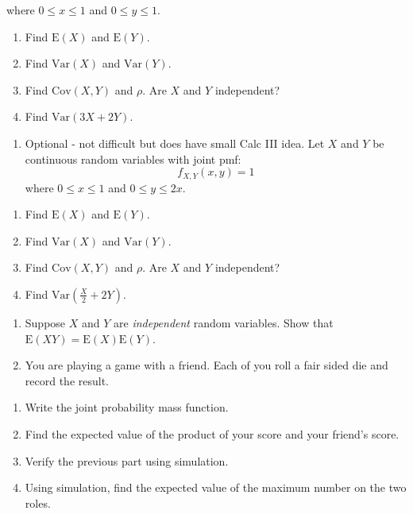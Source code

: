 \documentclass[
  letterpaper,
  DIV=11,
  numbers=noendperiod]{scrreprt}
\providecommand{\tightlist}{%
  \setlength{\itemsep}{0pt}\setlength{\parskip}{0pt}}\usepackage{longtable,booktabs,array}
\begin{document}
where \(0 \leq x \leq 1\) and \(0 \leq y \leq 1\).

\begin{enumerate}
\def\labelenumi{\alph{enumi}.}
\tightlist
\item
  Find \(\mbox{E}(X)\) and \(\mbox{E}(Y)\).\\
\item
  Find \(\mbox{Var}(X)\) and \(\mbox{Var}(Y)\).\\
\item
  Find \(\mbox{Cov}(X,Y)\) and \(\rho\). Are \(X\) and \(Y\)
  independent?\\
\item
  Find \(\mbox{Var}(3X+2Y)\).
\end{enumerate}

\begin{enumerate}
\def\labelenumi{\arabic{enumi}.}
\setcounter{enumi}{1}
\tightlist
\item
  Optional - not difficult but does have small Calc III idea. Let \(X\)
  and \(Y\) be continuous random variables with joint pmf: \[
  f_{X,Y}(x,y)=1
  \] where \(0 \leq x \leq 1\) and \(0 \leq y \leq 2x\).
\end{enumerate}

\begin{enumerate}
\def\labelenumi{\alph{enumi}.}
\item
  Find \(\mbox{E}(X)\) and \(\mbox{E}(Y)\).
\item
  Find \(\mbox{Var}(X)\) and \(\mbox{Var}(Y)\).
\item
  Find \(\mbox{Cov}(X,Y)\) and \(\rho\). Are \(X\) and \(Y\)
  independent?
\item
  Find \(\mbox{Var}\left(\frac{X}{2}+2Y\right)\).
\end{enumerate}

\begin{enumerate}
\def\labelenumi{\arabic{enumi}.}
\setcounter{enumi}{2}
\item
  Suppose \(X\) and \(Y\) are \emph{independent} random variables. Show
  that \(\mbox{E}(XY)=\mbox{E}(X)\mbox{E}(Y)\).
\item
  You are playing a game with a friend. Each of you roll a fair sided
  die and record the result.
\end{enumerate}

\begin{enumerate}
\def\labelenumi{\alph{enumi}.}
\item
  Write the joint probability mass function.
\item
  Find the expected value of the product of your score and your friend's
  score.
\item
  Verify the previous part using simulation.
\item
  Using simulation, find the expected value of the maximum number on the
  two roles.
\end{enumerate}
\end{document}

